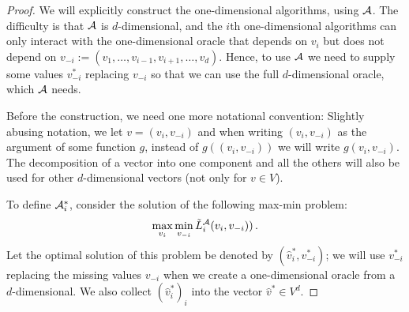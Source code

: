 \begin{proof}
We will explicitly construct the one-dimensional algorithms, using $\mathcal{A}$. The difficulty is that $\mathcal{A}$ is $d$-dimensional, and the $i$th one-dimensional algorithms can only interact with the one-dimensional oracle
that depends on $v_i$ but does not depend on  $v_{-i}:=(v_1,\ldots,v_{i-1},v_{i+1},\ldots,v_d)$.
Hence, to use $\mathcal{A}$ we need to supply some values $v_{-i}^*$ replacing $v_{-i}$ so that we can use 
the full $d$-dimensional oracle, which $\mathcal{A}$ needs.

Before the construction, we need one more notational convention: 
Slightly abusing notation, we let $v = (v_i,v_{-i})$ and when writing $(v_i,v_{-i})$ as the argument of some function $g$, instead of $g( (v_i,v_{-i}) )$ we will write $g( v_i,v_{-i})$. The decomposition of a vector into one component and all the others will also be used for other $d$-dimensional vectors (not only for $v\in V$).

To define $\mathcal{A}_i^*$, consider the solution of the following max-min problem:
\[
\max_{v_i} \min_{v_{-i}} \tilde{L}^{\mathcal{A}}_i(v_i, v_{-i}))\,.
\]
Let the optimal solution of this problem be denoted by $(\hat{v}_i^*,v_{-i}^*)$; we will use $v_{-i}^*$ replacing the missing values $v_{-i}$ when
we create a one-dimensional oracle from a $d$-dimensional.
We also collect $(\hat{v}_i^*)_i$ into the vector $\hat{v}^*\in V^d$.


\end{proof}
